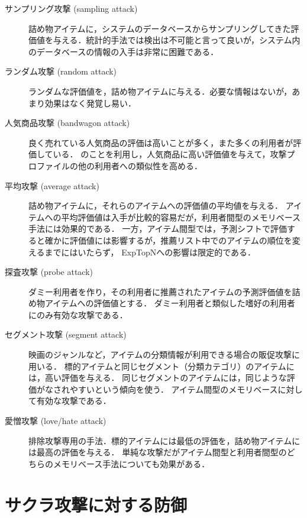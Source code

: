 \begin{description}
\item[サンプリング攻撃 (sampling attack)]
詰め物アイテムに，システムのデータベースからサンプリングしてきた評価値を与える．統計的手法では検出は不可能と言って良いが，システム内のデータベースの情報の入手は非常に困難である．
\item[ランダム攻撃 (random attack)]
ランダムな評価値を，詰め物アイテムに与える\cite{www:04:01}．必要な情報はないが，あまり効果はなく発覚し易い．
\item[人気商品攻撃 (bandwagon attack)]
良く売れている人気商品の評価は高いことが多く，また多くの利用者が評価している．
のことを利用し，人気商品に高い評価値を与えて，攻撃プロファイルの他の利用者への類似性を高める\cite{jacm:04:02}．
\item[平均攻撃 (average attack)]
詰め物アイテムに，それらのアイテムへの評価値の平均値を与える\cite{www:04:01}．
アイテムへの平均評価値は入手が比較的容易だが，利用者間型のメモリベース手法には効果的である．
一方，アイテム間型では，予測シフトで評価すると確かに評価値には影響するが，推薦リスト中でのアイテムの順位を変えるまでにはいたらず， ExpTopNへの影響は限定的である．
\item[探査攻撃 (probe attack)]
ダミー利用者を作り，その利用者に推薦されたアイテムの予測評価値を詰め物アイテムへの評価値とする\cite{ieeem:07:07}．
ダミー利用者と類似した嗜好の利用者にのみ有効な攻撃である．
\item[セグメント攻撃 (segment attack)]
映画のジャンルなど，アイテムの分類情報が利用できる場合の販促攻撃に用いる\cite{icdm:05:06}．
標的アイテムと同じセグメント（分類カテゴリ）のアイテムには，高い評価を与える．
同じセグメントのアイテムには，同じような評価がなされやすいという傾向を使う．
アイテム間型のメモリベースに対して有効な攻撃である．
\item[愛憎攻撃 (love/hate attack)]
排除攻撃専用の手法．標的アイテムには最低の評価を，詰め物アイテムには最高の評価を与える\cite{kdd:06:01}．
単純な攻撃だがアイテム間型と利用者間型のどちらのメモリベース手法についても効果がある．
\end{description}

\section{サクラ攻撃に対する防御}
\label{sec:shilling:defence}

